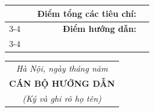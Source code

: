 \documentclass[DoAn.tex]{subfiles}
\begin{document}
\begin{center}
{\begin{tabular}{cc|l|l|}
\multicolumn{1}{l}{}                                       & \multicolumn{1}{l|}{}                                                                                                                   & \multicolumn{1}{r|}{\textbf{Điểm tổng các tiêu chí:}}                                                                                                                                                                                                                                                                                                            &                        \\ \cline{3-4} 
\multicolumn{1}{l}{}                                       & \multicolumn{1}{l|}{}                                                                                                                   & \multicolumn{1}{r|}{\textbf{Điểm hướng dẫn:}}                                                                                                                                                                                                                                                                                                                    &                        \\ \cline{3-4} 
\end{tabular}}
\end{center}

\vspace{0.05cm}


\begin{flushright}
\begin{tabular}{@{}c@{}}
\textit{Hà Nội, ngày \underline{\hspace{0.9cm}} tháng \underline{\hspace{0.9cm}} năm \underline{\hspace{0.9cm}}}\\[0.15cm]
\textbf{CÁN BỘ HƯỚNG DẪN}\\
\textit{(Ký và ghi rõ họ tên)}
\end{tabular}
\end{flushright}
\end{document}
